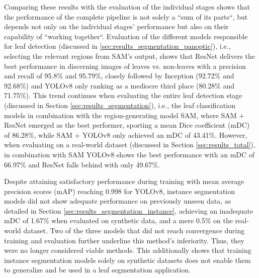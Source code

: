 \documentclass[draft,final]{vutinfth} %
\begin{document}
Comparing these results with the evaluation of the individual stages shows that the performance of the complete pipeline is not solely a ``sum of its parts``, but depends not only on the individual stages' performance but also on their capability of ``working together``. 
Evaluation of the different models responsible for leaf detection (discussed in \ref{sec:results_segmentation_panoptic}), i.e., selecting the relevant regions from SAM's output, shows that ResNet delivers the best performance in discerning images of leaves vs. non-leaves with a precision and recall of 95.8\% and 95.79\%, closely followed by Inception (92.72\% and 92.68\%) and YOLOv8 only ranking as a mediocre third place (80.28\% and 71.75\%). This trend continues when evaluating the entire leaf detection stage (discussed in Section \ref{sec:results_segmentation}), i.e., the leaf classification models in combination with the region-generating model SAM, where SAM + ResNet emerged as the best performer, sporting a mean Dice coefficient (mDC) of 86.28\%, while SAM + YOLOv8 only achieved an mDC of 43.41\%. However, when evaluating on a real-world dataset (discussed in Section \ref{sec:results_total}), in combination with SAM YOLOv8 shows the best performance with an mDC of 66.97\% and ResNet falls behind with only 49.67\%.

Despite attaining satisfactory performance during training with mean average precision scores (mAP) reaching 0.998 for YOLOv8, instance segmentation models did not show adequate performance on previously unseen data, as detailed in Section \ref{sec:results_segmentation_instance}, achieving an inadequate mDC of 1.67\% when evaluated on synthetic data, and a mere 0.5\% on the real-world dataset. 
Two of the three models that did not reach convergence during training and evaluation further underline this method's inferiority. Thus, they were no longer considered viable methods. This additionally shows that training instance segmentation models solely on synthetic datasets does not enable them to generalize and be used in a leaf segmentation application. 
\end{document}
